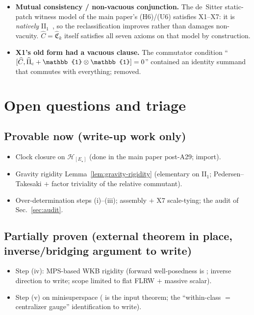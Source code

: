 \documentclass[11pt,a4paper]{article}
\theoremstyle{definition}
\theoremstyle{remark}
\newcommand{\HH}{\mathcal{H}}
\newcommand{\CC}{\mathbb{C}}
\newcommand{\id}{\mathbb{1}}
\begin{document}
\begin{itemize}[leftmargin=*,nosep]
    deriving thermal time. The non-degeneracy clause
    ($h\notin\CC\id$) is required: without it X2 is vacuous on
    the II$_1$ sector and the conjunction X1--X7 loses
    gravity-sector selectivity entirely --- this is the new
    failure mode introduced by the II$_1$ reclassification,
    and it is exactly why X2 cannot be stated w.r.t.\ the
    trace.
  \item \textbf{Mutual consistency / non-vacuous
    conjunction.} The de~Sitter static-patch witness model of
    the main paper's (H6)/(U6) satisfies X1--X7: it is
    \emph{natively} II$_1$~\cite{CLPW2022}, so the
    reclassification improves rather than damages
    non-vacuity. $\widehat C=\widehat{\mathfrak C}_k$ itself
    satisfies all seven axioms on that model by construction.
  \item \textbf{X1's old form had a vacuous clause.} The
    commutator condition
    ``$[\widehat C,\widehat\Pi_{\rm c}+\id\otimes\id]=0$''
    contained an identity summand that commutes with
    everything; removed.
\end{itemize}

\section{Open questions and triage}
\label{sec:open}

\subsection*{Provable now (write-up work only)}
\begin{itemize}[leftmargin=*,nosep]
  \item Clock closure on $\HH_{[E_\star]}$ (done in the main
    paper post-A29; import).
  \item Gravity rigidity Lemma~\ref{lem:gravity-rigidity}
    (elementary on II$_1$; Pedersen--Takesaki
    \cite{PedersenTakesaki1973} $+$ factor triviality of the
    relative commutant).
  \item Over-determination steps (i)--(iii);
    assembly $+$ X7 scale-tying; the audit of
    Sec.~\ref{sec:audit}.
\end{itemize}

\subsection*{Partially proven (external theorem in place,
inverse/bridging argument to write)}
\begin{itemize}[leftmargin=*,nosep]
  \item Step (iv): MPS-based WKB rigidity (forward
    well-posedness is \cite{MedaPinamontiSiemssen2020};
    inverse direction to write; scope limited to flat FLRW
    $+$ massive scalar).
  \item Step (v) on minisuperspace
    (\cite{KaimakkamisSil2024} is the input theorem; the
    ``within-class $=$ centralizer gauge'' identification to
    write).
\end{itemize}
\end{document}
